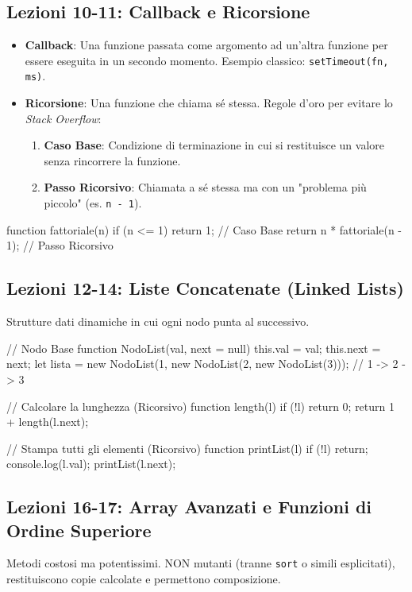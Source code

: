 \documentclass[a4paper,10pt]{article}
\begin{document}
\subsection{Lezioni 10-11: Callback e Ricorsione}
\begin{itemize}
    \item \textbf{Callback}: Una funzione passata come argomento ad un'altra funzione per essere eseguita in un secondo momento. Esempio classico: \texttt{setTimeout(fn, ms)}.
    \item \textbf{Ricorsione}: Una funzione che chiama sé stessa. Regole d'oro per evitare lo \textit{Stack Overflow}:
    \begin{enumerate}
        \item \textbf{Caso Base}: Condizione di terminazione in cui si restituisce un valore senza rincorrere la funzione.
        \item \textbf{Passo Ricorsivo}: Chiamata a sé stessa ma con un "problema più piccolo" (es. \texttt{n - 1}).
    \end{enumerate}
\end{itemize}
\begin{jsbox}[title={Snippet: Ricorsione Base (Fattoriale)}]
function fattoriale(n) {
    if (n <= 1) return 1; // Caso Base
    return n * fattoriale(n - 1); // Passo Ricorsivo
}
\end{jsbox}

\subsection{Lezioni 12-14: Liste Concatenate (Linked Lists)}
Strutture dati dinamiche in cui ogni nodo punta al successivo.

\begin{jsbox}[title={Snippet: Definizione e Ricorsione su Liste}]
// Nodo Base
function NodoList(val, next = null) {
    this.val = val; 
    this.next = next;
}
let lista = new NodoList(1, new NodoList(2, new NodoList(3))); // 1 -> 2 -> 3

// Calcolare la lunghezza (Ricorsivo)
function length(l) {
    if (!l) return 0;
    return 1 + length(l.next);
}

// Stampa tutti gli elementi (Ricorsivo)
function printList(l) {
    if (!l) return;
    console.log(l.val);
    printList(l.next);
}
\end{jsbox}

\subsection{Lezioni 16-17: Array Avanzati e Funzioni di Ordine Superiore}
Metodi costosi ma potentissimi. NON mutanti (tranne \texttt{sort} o simili esplicitati), restituiscono copie calcolate e permettono composizione.
\end{document}
